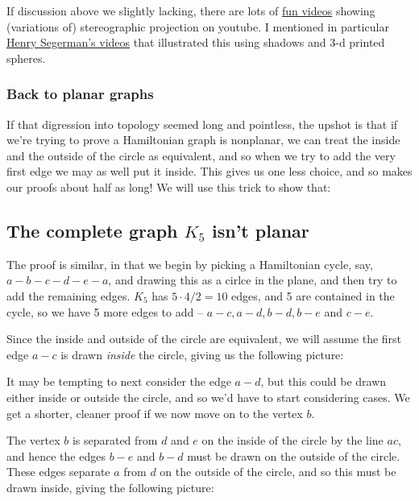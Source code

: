 \documentclass[]{article}
\begin{document}
If discussion above we slightly lacking, there are lots of
\href{https://www.youtube.com/watch?v=6JgGKViQzbc}{fun videos} showing
(variations of) stereographic projection on youtube. I mentioned in
particular \href{https://www.youtube.com/watch?v=VX-0Laeczgk}{Henry
Segerman's videos} that illustrated this using shadows and 3-d printed
spheres.

\subsubsection{Back to planar graphs}\label{back-to-planar-graphs}

If that digression into topology seemed long and pointless, the upshot
is that if we're trying to prove a Hamiltonian graph is nonplanar, we
can treat the inside and the outside of the circle as equivalent, and so
when we try to add the very first edge we may as well put it inside.
This gives us one less choice, and so makes our proofs about half as
long! We will use this trick to show that:

\subsection{\texorpdfstring{The complete graph \(K_5\) isn't
planar}{The complete graph K\_5 isn't planar}}\label{the-complete-graph-kux5f5-isnt-planar}

The proof is similar, in that we begin by picking a Hamiltonian cycle,
say, \(a-b-c-d-e-a\), and drawing this as a cirlce in the plane, and
then try to add the remaining edges. \(K_5\) has \(5\cdot 4/2=10\)
edges, and 5 are contained in the cycle, so we have 5 more edges to add
-- \(a-c, a-d, b-d,b-e\) and \(c-e\).

Since the inside and outside of the circle are equivalent, we will
assume the first edge \(a-c\) is drawn \emph{inside} the circle, giving
us the following picture:

It may be tempting to next consider the edge \(a-d\), but this could be
drawn either inside or outside the circle, and so we'd have to start
considering cases. We get a shorter, cleaner proof if we now move on to
the vertex \(b\).

The vertex \(b\) is separated from \(d\) and \(e\) on the inside of the
circle by the line \(ac\), and hence the edges \(b-e\) and \(b-d\) must
be drawn on the outside of the circle. These edges separate \(a\) from
\(d\) on the outside of the circle, and so this must be drawn inside,
giving the following picture:
\end{document}
